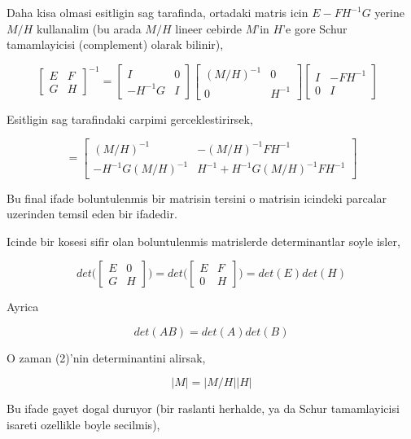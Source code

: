 \documentclass[12pt,fleqn]{article}\usepackage{../common}
\begin{document}
Daha kisa olmasi esitligin sag tarafinda, ortadaki matris icin
$E-FH^{-1}G$ yerine $M/H$ kullanalim (bu arada $M/H$ lineer cebirde $M$'in
$H$'e gore Schur tamamlayicisi (complement) olarak bilinir),

\[ 
\left[\begin{array}{rr}
E & F \\
G & H
\end{array}\right]^{-1}
=
\left[\begin{array}{rr}
I & 0 \\
-H^{-1}G & I
\end{array}\right] 
\left[\begin{array}{rr}
(M/H)^{-1} & 0 \\
0 & H^{-1}
\end{array}\right]
\left[\begin{array}{rr}
I & -FH^{-1} \\
0 & I
\end{array}\right] 
\ \ \ \label{3}
 \]

Esitligin sag tarafindaki carpimi gerceklestirirsek, 

\[ =
\left[\begin{array}{rr}
(M/H)^{-1} & -(M/H)^{-1}FH^{-1} \\
-H^{-1}G(M/H)^{-1} & H^{-1}+H^{-1}G(M/H)^{-1}FH^{-1} 
\end{array}\right]
 \]

Bu final ifade boluntulenmis bir matrisin tersini o matrisin icindeki parcalar
uzerinden temsil eden bir ifadedir. 

Icinde bir kosesi sifir olan boluntulenmis matrislerde determinantlar soyle
isler,

\[ 
det \bigg(
\left[\begin{array}{rr}
E & 0 \\
G & H
\end{array}\right]
\bigg) 
= 
det \bigg(
\left[\begin{array}{rr}
E & F \\
0 & H
\end{array}\right] 
\bigg) =
det(E)det(H)
 \]

Ayrica 

\[ det(AB) = det(A)det(B) \]

O zaman (2)'nin determinantini alirsak, 

\[ |M| = |M/H||H| \]

Bu ifade gayet dogal duruyor (bir raslanti herhalde, ya da Schur tamamlayicisi 
isareti ozellikle boyle secilmis),
\end{document}
